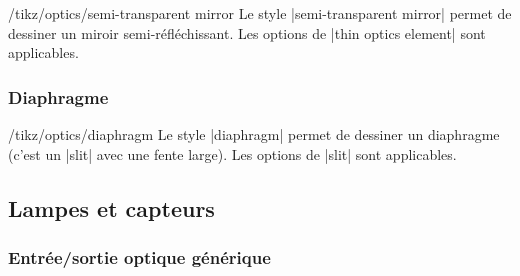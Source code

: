 \documentclass[a4paper]{ltxdoc}
\begin{document}
\begin{stylekey}{/tikz/optics/semi-transparent mirror}
Le style |semi-transparent mirror| permet de dessiner un miroir semi-réfléchissant. Les options de |thin optics element| sont applicables.

\begin{codeexample}[width=6cm]
\end{codeexample}
\end{stylekey}

\subsubsection{Diaphragme}

\begin{stylekey}{/tikz/optics/diaphragm}
Le style |diaphragm| permet de dessiner un diaphragme (c'est un |slit| avec une fente large). Les options de |slit| sont applicables.

\begin{codeexample}[width=6cm]
\end{codeexample}
\end{stylekey}


\subsection{Lampes et capteurs}

\subsubsection{Entrée/sortie optique générique}
\end{document}
